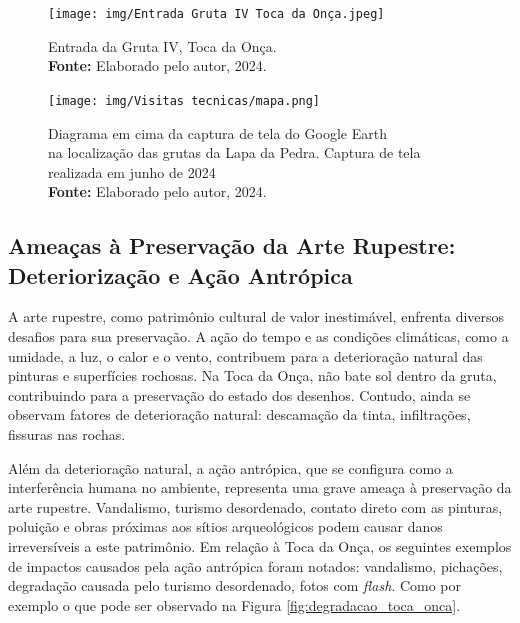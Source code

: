     
    \begin{figure}[H]
        \centering
        \texttt{[image: img/Entrada Gruta IV Toca da Onça.jpeg]}
        \caption{Entrada da Gruta IV, Toca da Onça. \\
            \textbf{Fonte:} Elaborado pelo autor, 2024.}
        \label{fig:Entrada da Gruta IV,Toca da Onça}
    \end{figure}
    
    \begin{figure}[H]
        \centering
        \texttt{[image: img/Visitas tecnicas/mapa.png]}
        \caption{ Diagrama em cima da captura de tela do Google Earth \\ na localização das grutas da Lapa da Pedra. Captura de tela realizada em junho de 2024 \\
            \textbf{Fonte:} Elaborado pelo autor, 2024.}
        \label{fig:mapa}
    \end{figure}
    
    
    \subsection{Ameaças à Preservação da Arte Rupestre: Deteriorização e Ação Antrópica}\label{sec:amecas a preservação}
    A arte rupestre, como patrimônio cultural de valor inestimável, enfrenta diversos desafios para sua preservação. A ação do tempo e as condições climáticas, como a umidade, a luz, o calor e o vento, contribuem para a deterioração natural das pinturas e superfícies rochosas.
    Na Toca da Onça,  não bate sol dentro da gruta, contribuindo para a preservação do estado dos desenhos. Contudo, ainda se observam fatores de deterioração natural: descamação da tinta, infiltrações, fissuras nas rochas.
    
    
    Além da deterioração natural, a ação antrópica, que se configura como a interferência humana no ambiente, representa uma grave ameaça à preservação da arte rupestre. Vandalismo, turismo desordenado, contato direto com as pinturas, poluição e obras próximas aos sítios arqueológicos podem causar danos irreversíveis a este patrimônio.
    Em relação à Toca da Onça, os seguintes exemplos de impactos causados pela ação antrópica foram notados: vandalismo, pichações, degradação causada pelo turismo desordenado, fotos com \textit{flash}. Como por exemplo o que pode ser observado na Figura \ref{fig:degradacao_toca_onca}.
    
